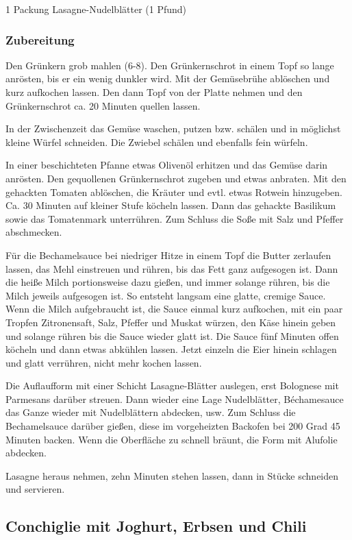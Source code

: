 1 Packung Lasagne-Nudelblätter (1 Pfund)

\subsubsection*{Zubereitung}

Den Grünkern grob mahlen (6-8). Den Grünkernschrot in einem Topf so lange anrösten, bis er ein wenig dunkler wird. Mit der Gemüsebrühe ablöschen und kurz aufkochen lassen. Den dann Topf von der Platte nehmen und den Grünkernschrot ca. 20 Minuten quellen lassen. 

In der Zwischenzeit das Gemüse waschen, putzen bzw. schälen und in möglichst kleine Würfel schneiden. Die Zwiebel schälen und ebenfalls fein würfeln.

In einer beschichteten Pfanne etwas Olivenöl erhitzen und das Gemüse darin anrösten. Den gequollenen Grünkernschrot zugeben und etwas anbraten. Mit den gehackten Tomaten ablöschen, die Kräuter und evtl. etwas Rotwein hinzugeben. Ca. 30 Minuten auf kleiner Stufe köcheln lassen. Dann das gehackte Basilikum sowie das Tomatenmark unterrühren. Zum Schluss die Soße mit Salz und Pfeffer abschmecken.

Für die Bechamelsauce bei niedriger Hitze in einem Topf die Butter zerlaufen lassen, das Mehl einstreuen und rühren, bis das Fett ganz aufgesogen ist. Dann die heiße Milch portionsweise dazu gießen, und immer solange rühren, bis die Milch jeweils aufgesogen ist. So entsteht langsam eine glatte, cremige Sauce. Wenn die Milch aufgebraucht ist, die Sauce einmal kurz aufkochen, mit ein paar Tropfen Zitronensaft, Salz, Pfeffer und Muskat würzen, den Käse hinein geben  und solange rühren bis die Sauce wieder glatt ist. Die Sauce fünf Minuten offen köcheln und dann etwas abkühlen lassen. Jetzt einzeln die 
Eier hinein schlagen und glatt verrühren, nicht mehr kochen lassen.

Die Auflaufform mit einer Schicht Lasagne-Blätter auslegen, erst Bolognese mit Parmesans darüber streuen. Dann wieder eine Lage Nudelblätter, Béchamesauce das Ganze wieder mit Nudelblättern abdecken, usw. Zum Schluss die Bechamelsauce darüber gießen, diese im vorgeheizten Backofen bei 200 Grad 45 Minuten backen. Wenn die Oberfläche zu schnell bräunt, die Form mit Alufolie abdecken.

Lasagne heraus nehmen, zehn Minuten stehen lassen, dann in Stücke schneiden und servieren.

\subsection{Conchiglie mit Joghurt, Erbsen und Chili} \label{sec:Conchiglie}

